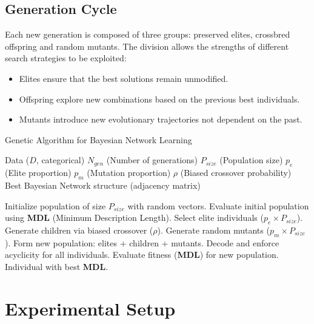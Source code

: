\documentclass[runningheads]{llncs}
\begin{document}
\subsection{Generation Cycle}

Each new generation is composed of three groups: preserved elites, crossbred offspring and random mutants. The division allows the strengths of different search strategies to be exploited:

\begin{itemize}
	\item Elites ensure that the best solutions remain unmodified.
	\item Offspring explore new combinations based on the previous best individuals.
	\item Mutants introduce new evolutionary trajectories not dependent on the past.		
\end{itemize}


\begin{algorithm}
	\caption{Genetic Algorithm for Bayesian Network Learning}
	\label{alg:genetic_bn_learning_simple}
	\begin{algorithmic}[1]
		\Require Data ($D$, categorical)
		\Require $N_{gen}$ (Number of generations)
		\Require $P_{size}$ (Population size)
		\Require $p_e$ (Elite proportion)
		\Require $p_m$ (Mutation proportion)
		\Require $\rho$ (Biased crossover probability)
		\Ensure Best Bayesian Network structure (adjacency matrix)
		
		\State Initialize population of size $P_{size}$ with random vectors.
		\State Evaluate initial population using \textbf{MDL} (Minimum Description Length).
		\State Select elite individuals ($p_e \times P_{size}$).
		\State Generate children via biased crossover ($\rho$).
		\State Generate random mutants ($p_m \times P_{size}$).
		\State Form new population: elites + children + mutants.
		\State Decode and enforce acyclicity for all individuals.
		\State Evaluate fitness (\textbf{MDL}) for new population.
		\EndFor
		\State \Return Individual with best \textbf{MDL}.
	\end{algorithmic}
\end{algorithm}



\newpage

\section{Experimental Setup}
\end{document}
